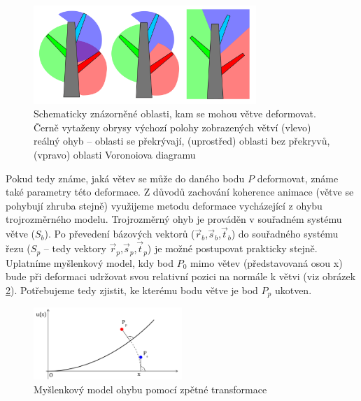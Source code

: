 \begin{figure}[!hbt]
\label{fig:sliceBilboard}
\begin{center}
\includegraphics[width=0.75\textwidth]{./figures/dataExpansionPrinciple.png}
\caption[Schematicky znázorněné oblasti, kam se mohou větve deformovat]%
{Schematicky znázorněné oblasti, kam se mohou větve deformovat. Černě vytaženy obrysy výchozí polohy zobrazených větví
(vlevo) reálný ohyb – oblasti se překrývají, (uprostřed) oblasti bez překryvů, (vpravo) oblasti Voronoiova diagramu}
\end{center}
\end{figure}

Pokud tedy známe, jaká větev se může do daného bodu $P$ deformovat, známe také parametry této deformace. Z důvodů zachování koherence animace (větve se pohybují zhruba stejně) využijeme metodu deformace vycházející z ohybu trojrozměrného modelu. Trojrozměrný ohyb je prováděn v souřadném systému větve ($S_b$). Po převedení bázových vektorů ($\vec{r}_b$,$\vec{s}_b$,$\vec{t}_b$) do souřadného systému řezu ($S_p$ – tedy vektory $\vec{r}_p$,$\vec{s}_p$,$\vec{t}_p$) je možné postupovat prakticky stejně. Uplatníme myšlenkový model, kdy bod $P_0$ mimo větev (představovaná osou x) bude při deformaci udržovat svou relativní pozici na normále k větvi (viz obrázek \ref{fig:bendModel}). Potřebujeme tedy zjistit, ke kterému bodu větve je bod $P_p$ ukotven.

\begin{figure}[!hbt]
\begin{center}
\includegraphics[width=0.5\textwidth]{./figures/revDef_ideal.png}
\caption{Myšlenkový model ohybu pomocí zpětné transformace\label{fig:bendModel}}
\end{center}
\end{figure}
 

